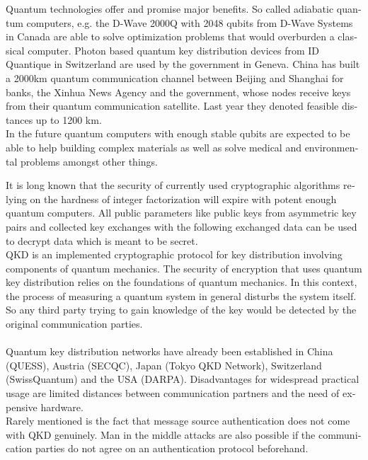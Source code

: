 \documentclass[a4paper,11pt,draft]{article}
\begin{document}
\begin{otherlanguage}{english}
\begin{multicols}{2}

Quantum technologies offer and promise major benefits. So called adiabatic quantum computers, e.g. the D-Wave 2000Q with 2048 qubits from D-Wave Systems in Canada are able to solve optimization problems that would overburden a classical computer. Photon based quantum key distribution devices from ID Quantique in Switzerland are used by the government in Geneva. China has built a 2000km quantum communication channel between Beijing and Shanghai for banks, the Xinhua News Agency and the government, whose nodes receive keys from their quantum communication satellite. Last year they denoted feasible distances up to 1200 km. \\
In the future quantum computers with enough stable qubits are expected to be able to help building complex materials as well as solve medical and environmental problems amongst other things.


It is long known that the security of currently used cryptographic algorithms relying on the hardness of integer factorization will expire with potent enough quantum computers. All public parameters like public keys from asymmetric key pairs and collected key exchanges with the following exchanged data can be used to decrypt data which is meant to be secret. \\

QKD is an implemented cryptographic protocol for key distribution involving components of quantum mechanics. The security of encryption that uses quantum key distribution relies on the foundations of quantum mechanics. In this context, the process of measuring a quantum system in general disturbs the system itself. So any third party trying to gain knowledge of the key would be detected by the original communication parties. \\ 
\\
Quantum key distribution networks have already been established in China (QUESS), Austria (SECQC), Japan (Tokyo QKD Network), Switzerland (SwissQuantum) and the USA (DARPA). 
Disadvantages for widespread practical usage are limited distances between communication partners and the need of expensive hardware. \\
Rarely mentioned is the fact that message source authentication does not come with QKD genuinely. Man in the middle attacks are also possible if the communication parties do not agree on an authentication protocol beforehand.  


\end{multicols}
\end{otherlanguage}
\end{document}
